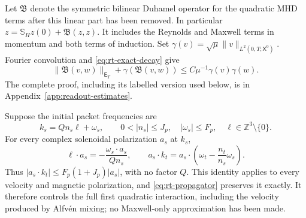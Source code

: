 \documentclass[11pt,a4paper]{amsart}
\theoremstyle{definition}
\theoremstyle{remark}
\numberwithin{equation}{section}
\newcommand{\Z}{\mathbb Z}
\newcommand{\norm}[1]{\lVert #1\rVert}
\begin{document}
Let $\mathfrak B$ denote the symmetric bilinear Duhamel operator for the
quadratic MHD terms after this linear part has been removed.  In particular
$z=\mathbb S_Hz(0)+\mathfrak B(z,z)$.  It includes the Reynolds and Maxwell
terms in momentum and both terms of induction.  Set
$\gamma(v)=\sqrt\mu\norm v_{L^2(0,T;\mathsf X^0)}$.  Fourier convolution
and \eqref{eq:rt-exact-decay} give
\begin{equation}\label{eq:rt-critical-bilinear}
 \norm{\mathfrak B(v,w)}_{\mathsf E_T}
       +\gamma(\mathfrak B(v,w))
 \le C\mu^{-1}\gamma(v)\gamma(w).
\end{equation}
The complete proof, including its labelled version used below, is in
Appendix~\ref{app:readout-estimates}.

Suppose the initial packet frequencies are
\begin{equation}\label{eq:rt-collinear-frequencies}
 k_s=Qn_s\ell+\omega_s,
 \qquad 0<|n_s|\le J_p,\quad |\omega_s|\le F_p,
 \quad \ell\in\Z^3\setminus\{0\}.
\end{equation}
For every complex solenoidal polarization $a_s$ at $k_s$,
\begin{equation}\label{eq:rt-direction-cancellation}
 \ell\cdot a_s=-\frac{\omega_s\cdot a_s}{Qn_s},
 \qquad
 a_s\cdot k_t
  =a_s\cdot\left(\omega_t-\frac{n_t}{n_s}\omega_s\right).
\end{equation}
Thus $|a_s\cdot k_t|\le F_p(1+J_p)|a_s|$, with no factor $Q$.
This identity applies to every velocity and magnetic polarization, and
\eqref{eq:rt-propagator} preserves it exactly.  It therefore controls the
full first quadratic interaction, including the velocity produced by
Alfv\'en mixing; no Maxwell-only approximation has been made.
\end{document}
